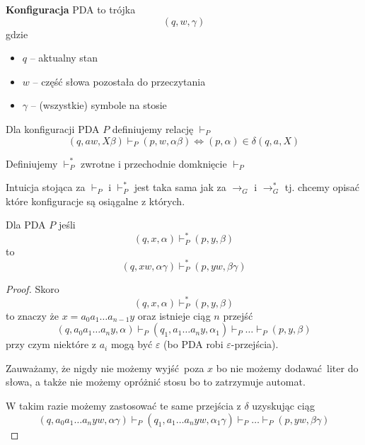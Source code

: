 \begin{definition}
    \textbf{Konfiguracja} PDA to trójka
    \[
        (q, w, \gamma)
    \]
    gdzie
    \begin{itemize}
        \item \( q \) -- aktualny stan
        \item \( w \) -- część słowa pozostała do przeczytania
        \item \( \gamma \) -- (wszystkie) symbole na stosie
    \end{itemize}
\end{definition}

\begin{definition}
    Dla konfiguracji PDA \( P \) definiujemy relację \( \vdash_P \)
    \[
        (q, aw, X\beta) \vdash_P (p, w, \alpha \beta)
        \iff
        (p, \alpha) \in \delta(q, a, X)
    \]
\end{definition}

\begin{definition}
    Definiujemy \( \vdash_P^* \) zwrotne i przechodnie domknięcie \( \vdash_P \)
\end{definition}

Intuicja stojąca za \( \vdash_P \) i \( \vdash_P^* \) jest taka sama jak za \( \rightarrow_G \) i \( \rightarrow_G^* \) tj. chcemy opisać które konfiguracje są osiągalne z których.

\begin{lemma}
    \label{pda-stack-extending-lemma}
    Dla PDA \( P \) jeśli
    \[
        (q, x, \alpha) \vdash_P^* (p, y, \beta)
    \]
    to
    \[
        (q, xw, \alpha\gamma) \vdash_P^* (p, yw, \beta\gamma)
    \]
\end{lemma}
\begin{proof}
    Skoro 
    \[
        (q, x, \alpha) \vdash_P^* (p, y, \beta)
    \]
    to znaczy że \( x = a_0a_1\dots a_{n-1}y \) oraz istnieje ciąg \( n \) przejść
    \[
        (q, a_0a_1\dots a_ny, \alpha) \vdash_P (q_1, a_1\dots a_ny, \alpha_1) \vdash_P \dots
        \vdash_P (p, y, \beta)
    \]
    przy czym niektóre z \( a_i \) mogą być \( \varepsilon \) (bo PDA robi \(\varepsilon\)-przejścia).
    
    Zauważamy, że nigdy nie możemy wyjść poza \( x \) bo nie możemy dodawać liter do słowa, a także nie możemy opróżnić stosu bo to zatrzymuje automat.
    
    W takim razie możemy zastosować te same przejścia z \( \delta \) uzyskując ciąg
   \[
        (q, a_0a_1\dots a_nyw, \alpha\gamma) \vdash_P (q_1, a_1\dots a_nyw, \alpha_1\gamma) \vdash_P \dots
        \vdash_P (p, yw, \beta\gamma)
    \]
\end{proof}

